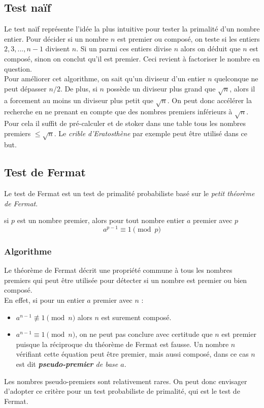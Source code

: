 		\subsection{Test naïf}
			Le test naïf représente l'idée la plus intuitive pour tester la primalité d'un nombre entier. Pour décider si un nombre $n$ est premier ou composé, on teste si les entiers $2, 3, ..., n-1$ divisent $n$. Si un parmi ces entiers divise $n$ alors on déduit que $n$ est composé, sinon on conclut qu'il est premier. Ceci revient à factoriser le nombre en question.\\
			Pour améliorer cet algorithme, on sait qu'un diviseur d'un entier $n$ quelconque ne peut dépasser $n/2$. De plus, si $n$ possède un diviseur plus grand que $\sqrt{n}$, alors il a forcement au moins un diviseur plus petit que $\sqrt{n}$. On peut donc accélérer la recherche en ne prenant en compte que des nombres premiers inférieurs à $\sqrt{n}$. Pour cela il suffit de pré-calculer et de stoker dans une table tous les nombres premiers $\leqslant \sqrt{n}$. Le \textit{crible d'Eratosthène} par exemple peut être utilisé dans ce but.
		
		\subsection{Test de Fermat}
			Le test de Fermat est un test de primalité probabiliste basé sur le \textit{petit théorème de Fermat}.
			\vspace{-1.5em}\begin{adjustwidth}{1.5cm}{1.5cm} 
			\begin{Th}
				si $p$ est un nombre premier, alors pour tout nombre entier $a$ premier avec $p$
				\[a^{p-1}\equiv 1 \pmod p\]
			\end{Th}
			\end{adjustwidth}\vspace{0.5em}
			
			\subsubsection{Algorithme}
				Le théorème de Fermat décrit une propriété commune à tous les nombres premiers qui peut être utilisée pour détecter si un nombre est premier ou bien composé.\\
				En effet, si pour un entier $a$ premier avec $n$ : 
				\begin{itemize}
				\item $a^{n-1} \not\equiv 1 \pmod n$ alors $n$ est surement composé.
				\item $a^{n-1}\equiv 1 \pmod n$, on ne peut pas conclure avec certitude que $n$ est premier puisque la réciproque du théorème de Fermat est fausse. Un nombre $n$ vérifiant cette équation peut être premier, mais aussi composé, dans ce cas $n$ est dit \textit{\textbf{pseudo-premier} de base $a$}.
				\end{itemize}
				Les nombres pseudo-premiers sont relativement rares. On peut donc envisager d'adopter ce critère pour un test probabiliste de primalité, qui est le test de Fermat.
				
